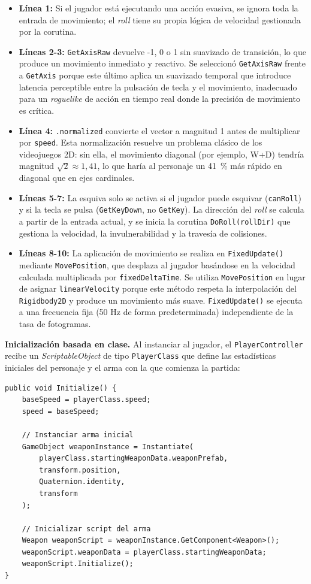 \begin{itemize}
\item \textbf{Línea 1:} Si el jugador está ejecutando una acción evasiva, se ignora toda la entrada de movimiento; el \textit{roll} tiene su propia lógica de velocidad gestionada por la corutina.
\item \textbf{Líneas 2-3:} \texttt{GetAxisRaw} devuelve -1, 0 o 1 sin suavizado de transición, lo que produce un movimiento inmediato y reactivo. Se seleccionó \texttt{GetAxisRaw} frente a \texttt{GetAxis} porque este último aplica un suavizado temporal que introduce latencia perceptible entre la pulsación de tecla y el movimiento, inadecuado para un \textit{roguelike} de acción en tiempo real donde la precisión de movimiento es crítica.
\item \textbf{Línea 4:} \texttt{.normalized} convierte el vector a magnitud 1 antes de multiplicar por \texttt{speed}. Esta normalización resuelve un problema clásico de los videojuegos 2D: sin ella, el movimiento diagonal (por ejemplo, W+D) tendría magnitud $\sqrt{2} \approx 1{,}41$, lo que haría al personaje un 41 \% más rápido en diagonal que en ejes cardinales.
\item \textbf{Líneas 5-7:} La esquiva solo se activa si el jugador puede esquivar (\texttt{canRoll}) y si la tecla se pulsa (\texttt{GetKeyDown}, no \texttt{GetKey}). La dirección del \textit{roll} se calcula a partir de la entrada actual, y se inicia la corutina \texttt{DoRoll(rollDir)} que gestiona la velocidad, la invulnerabilidad y la travesía de colisiones.
\item \textbf{Líneas 8-10:} La aplicación de movimiento se realiza en \texttt{FixedUpdate()} mediante \texttt{MovePosition}, que desplaza al jugador basándose en la velocidad calculada multiplicada por \texttt{fixedDeltaTime}. Se utiliza \texttt{MovePosition} en lugar de asignar \texttt{linearVelocity} porque este método respeta la interpolación del \texttt{Rigidbody2D} y produce un movimiento más suave. \texttt{FixedUpdate()} se ejecuta a una frecuencia fija (50 Hz de forma predeterminada) independiente de la tasa de fotogramas.
\end{itemize}

\textbf{Inicialización basada en clase.} Al instanciar al jugador, el \texttt{PlayerController} recibe un \textit{ScriptableObject} de tipo \texttt{PlayerClass} que define las estadísticas iniciales del personaje y el arma con la que comienza la partida:

\begin{lstlisting}
public void Initialize() {
    baseSpeed = playerClass.speed;
    speed = baseSpeed;
    
    // Instanciar arma inicial
    GameObject weaponInstance = Instantiate(
        playerClass.startingWeaponData.weaponPrefab,
        transform.position,
        Quaternion.identity,
        transform
    );
    
    // Inicializar script del arma
    Weapon weaponScript = weaponInstance.GetComponent<Weapon>();
    weaponScript.weaponData = playerClass.startingWeaponData;
    weaponScript.Initialize();
}
\end{lstlisting}


